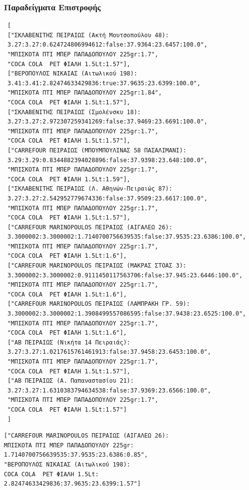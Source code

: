 \documentclass[a4paper,10pt]{report}
\begin{document}
\subsubsection{Παραδείγματα Επιστροφής}
\begin{verbatim}
 [
 ["ΣΚΛΑΒΕΝΙΤΗΣ ΠΕΙΡΑΙΩΣ (Ακτή Μουτσοπούλου 48):
 3.27:3.27:0.624724806994612:false:37.9364:23.6457:100.0",
 "ΜΠΙΣΚΟΤΑ ΠΤΙ ΜΠΕΡ ΠΑΠΑΔΟΠΟΥΛΟΥ 225gr:1.7",
 "COCA COLA  PET ΦΙΑΛΗ 1.5Lt:1.57"],
 ["ΒΕΡΟΠΟΥΛΟΣ ΝΙΚΑΙΑΣ (Αιτωλικού 198):
 3.41:3.41:2.82474633429836:true:37.9635:23.6399:100.0",
 "ΜΠΙΣΚΟΤΑ ΠΤΙ ΜΠΕΡ ΠΑΠΑΔΟΠΟΥΛΟΥ 225gr:1.84",
 "COCA COLA  PET ΦΙΑΛΗ 1.5Lt:1.57"],
 ["ΣΚΛΑΒΕΝΙΤΗΣ ΠΕΙΡΑΙΩΣ (Σμολένσκυ 18):
 3.27:3.27:2.972307259341269:false:37.9469:23.6691:100.0",
 "ΜΠΙΣΚΟΤΑ ΠΤΙ ΜΠΕΡ ΠΑΠΑΔΟΠΟΥΛΟΥ 225gr:1.7",
 "COCA COLA  PET ΦΙΑΛΗ 1.5Lt:1.57"],
 ["CARREFOUR ΠΕΙΡΑΙΩΣ (ΜΠΟΥΜΠΟΥΛΙΝΑΣ 58 ΠΑΣΑΛΙΜΑΝΙ):
 3.29:3.29:0.8344882394028896:false:37.9398:23.648:100.0",
 "ΜΠΙΣΚΟΤΑ ΠΤΙ ΜΠΕΡ ΠΑΠΑΔΟΠΟΥΛΟΥ 225gr:1.7",
 "COCA COLA  PET ΦΙΑΛΗ 1.5Lt:1.59"],
 ["ΣΚΛΑΒΕΝΙΤΗΣ ΠΕΙΡΑΙΩΣ (Λ. Αθηνών-Πειραιώς 87):
 3.27:3.27:2.542952779674336:false:37.9509:23.6617:100.0",
 "ΜΠΙΣΚΟΤΑ ΠΤΙ ΜΠΕΡ ΠΑΠΑΔΟΠΟΥΛΟΥ 225gr:1.7",
 "COCA COLA  PET ΦΙΑΛΗ 1.5Lt:1.57"],
 ["CARREFOUR MARINOPOULOS ΠΕΙΡΑΙΩΣ (ΑΙΓΑΛΕΩ 26):
 3.3000002:3.3000002:1.7140700756639535:false:37.9535:23.6386:100.0",
 "ΜΠΙΣΚΟΤΑ ΠΤΙ ΜΠΕΡ ΠΑΠΑΔΟΠΟΥΛΟΥ 225gr:1.7",
 "COCA COLA  PET ΦΙΑΛΗ 1.5Lt:1.6"],
 ["CARREFOUR MARINOPOULOS ΠΕΙΡΑΙΩΣ (ΜΑΚΡΑΣ ΣΤΟΑΣ 3):
 3.3000002:3.3000002:0.9111450117563706:false:37.945:23.6446:100.0",
 "ΜΠΙΣΚΟΤΑ ΠΤΙ ΜΠΕΡ ΠΑΠΑΔΟΠΟΥΛΟΥ 225gr:1.7",
 "COCA COLA  PET ΦΙΑΛΗ 1.5Lt:1.6"],
 ["CARREFOUR MARINOPOULOS ΠΕΙΡΑΙΩΣ (ΛΑΜΠΡΑΚΗ ΓΡ. 59):
 3.3000002:3.3000002:1.3908499557086595:false:37.9438:23.6525:100.0",
 "ΜΠΙΣΚΟΤΑ ΠΤΙ ΜΠΕΡ ΠΑΠΑΔΟΠΟΥΛΟΥ 225gr:1.7",
 "COCA COLA  PET ΦΙΑΛΗ 1.5Lt:1.6"],
 ["ΑΒ ΠΕΙΡΑΙΩΣ (Νικήτα 14 Πειραιάς):
 3.27:3.27:1.0217615761461913:false:37.9458:23.6453:100.0",
 "ΜΠΙΣΚΟΤΑ ΠΤΙ ΜΠΕΡ ΠΑΠΑΔΟΠΟΥΛΟΥ 225gr:1.7",
 "COCA COLA  PET ΦΙΑΛΗ 1.5Lt:1.57"],
 ["ΑΒ ΠΕΙΡΑΙΩΣ (Α. Παπαναστασίου 21):
 3.27:3.27:1.6310383794634538:false:37.9369:23.6566:100.0",
 "ΜΠΙΣΚΟΤΑ ΠΤΙ ΜΠΕΡ ΠΑΠΑΔΟΠΟΥΛΟΥ 225gr:1.7",
 "COCA COLA  PET ΦΙΑΛΗ 1.5Lt:1.57"]
 ]
\end{verbatim}
\begin{verbatim}
["CARREFOUR MARINOPOULOS ΠΕΙΡΑΙΩΣ (ΑΙΓΑΛΕΩ 26):
ΜΠΙΣΚΟΤΑ ΠΤΙ ΜΠΕΡ ΠΑΠΑΔΟΠΟΥΛΟΥ 225gr:
1.7140700756639535:37.9535:23.6386:0.85",
"ΒΕΡΟΠΟΥΛΟΣ ΝΙΚΑΙΑΣ (Αιτωλικού 198):
COCA COLA  PET ΦΙΑΛΗ 1.5Lt:
2.82474633429836:37.9635:23.6399:1.57"]
\end{verbatim}
\end{document}
